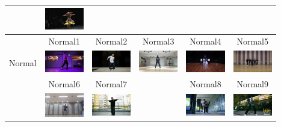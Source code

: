 \begin{table}[t]
\begin{center}
\begin{tabular}{|c|ccc|cc|}
        & \includegraphics[width=17mm]{images/snaps/belly_elegant.png}
      \\ \hline
        & Normal1\cite{ariana} & Normal2\cite{kadokawa} & Normal3\cite{bts} & Normal4\cite{btsgroup} & Normal5\cite{arashi}
      \\
      Normal
        & \includegraphics[width=17mm]{images/snaps/ariana_dance.png}
        & \includegraphics[width=17mm]{images/snaps/kadokawa_dream_dance.png}
        & \includegraphics[width=17mm]{images/snaps/bts_dance.png}
        & \includegraphics[width=17mm]{images/snaps/bts_group_dance.png}
        & \includegraphics[width=17mm]{images/snaps/arashi_group_dance.png}
      \\
      & Normal6\cite{manolo} & Normal7\cite{aito} & & Normal8\cite{hyoga} & Normal9\cite{legit}
      \\
        & \includegraphics[width=17mm]{images/snaps/manolo_dance.png}
        & \includegraphics[width=17mm]{images/snaps/aito_dance.png}
        &
        & \includegraphics[width=17mm]{images/snaps/hyoga_dance.png}
        & \includegraphics[width=17mm]{images/snaps/legit_dance.png}

\end{tabular}
\end{center}
\end{table}

